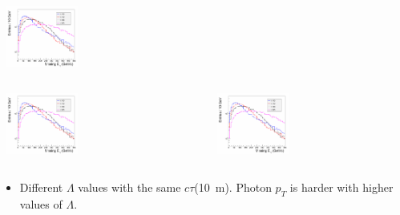 \documentclass{beamer}
\begin{document}
\begin{frame}
\begin{minipage}[t]{0.83\paperwidth}
\begin{columns}
\begin{column}{0.50\linewidth}
\begin{tcolorbox}[colback=UNL@Cream!5,colframe=UNL@LightGrey!70,title=\textcolor{UMN@Maroon}{\textbf{Neutralino $c\tau$ }}]
     \mbox{
\includegraphics[height=2cm, width=\textwidth]{THESISPLOTS/GMSB_MET.png}}
      \end{tcolorbox}
     \end{column}
   \end{columns}
\end{minipage}
\begin{minipage}[b]{0.83\paperwidth}
 \begin{columns}
     \begin{column}{0.50\linewidth}
      \begin{tcolorbox}[colback=UNL@Cream!5,colframe=UNL@LightGrey!70,title=\textcolor{UMN@Maroon}{\textbf{MET($E^{\mbox{miss}}_{T}$)}}] 
    \mbox{
           \includegraphics[height=2cm,width=\textwidth]{THESISPLOTS/GMSB_MET.png}}
       \end{tcolorbox}    
     \end{column}
     \begin{column}{0.50\linewidth}
     \begin{tcolorbox}[colback=UNL@Cream!5,colframe=UNL@LightGrey!70,title=\textcolor{UMN@Maroon}{\textbf{NJets}}]
     \mbox{
\includegraphics[height=2cm, width=\textwidth]{THESISPLOTS/GMSB_MET.png}}
      \end{tcolorbox}
     \end{column}
   \end{columns}
\begin{itemize}
    \item Different $\Lambda$ values with the same $c\tau$(10~m). Photon $p_{T}$ is harder with higher values of $\Lambda$.
  \end{itemize}
 \end{minipage}
\end{frame}
\end{document}
